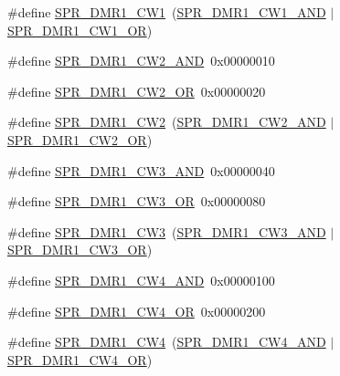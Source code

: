\begin{DoxyCompactItemize}
\item 
\#define \hyperlink{spr-defs_8h_a61edbf72823f6580885faf771a1b9d2e}{\-S\-P\-R\-\_\-\-D\-M\-R1\-\_\-\-C\-W1}~(\hyperlink{spr-defs_8h_a4d0eeeca3feb5fd4553ca7512e0153ad}{\-S\-P\-R\-\_\-\-D\-M\-R1\-\_\-\-C\-W1\-\_\-\-A\-N\-D} $|$ \hyperlink{spr-defs_8h_aa0da9be6e49302d7d11cfeba766cc1e8}{\-S\-P\-R\-\_\-\-D\-M\-R1\-\_\-\-C\-W1\-\_\-\-O\-R})
\item 
\#define \hyperlink{spr-defs_8h_a2a490710981cb9a68025078a3c7e9f95}{\-S\-P\-R\-\_\-\-D\-M\-R1\-\_\-\-C\-W2\-\_\-\-A\-N\-D}~0x00000010
\item 
\#define \hyperlink{spr-defs_8h_a90d7d268719617da9c105c6f3759aad7}{\-S\-P\-R\-\_\-\-D\-M\-R1\-\_\-\-C\-W2\-\_\-\-O\-R}~0x00000020
\item 
\#define \hyperlink{spr-defs_8h_a50fff39b8892ca9f2e098f432c1aee08}{\-S\-P\-R\-\_\-\-D\-M\-R1\-\_\-\-C\-W2}~(\hyperlink{spr-defs_8h_a2a490710981cb9a68025078a3c7e9f95}{\-S\-P\-R\-\_\-\-D\-M\-R1\-\_\-\-C\-W2\-\_\-\-A\-N\-D} $|$ \hyperlink{spr-defs_8h_a90d7d268719617da9c105c6f3759aad7}{\-S\-P\-R\-\_\-\-D\-M\-R1\-\_\-\-C\-W2\-\_\-\-O\-R})
\item 
\#define \hyperlink{spr-defs_8h_aa79fe77c48ff7a17cdf4005b62d5cd97}{\-S\-P\-R\-\_\-\-D\-M\-R1\-\_\-\-C\-W3\-\_\-\-A\-N\-D}~0x00000040
\item 
\#define \hyperlink{spr-defs_8h_a288169d5c179e9676afe0d1dfc8c62ae}{\-S\-P\-R\-\_\-\-D\-M\-R1\-\_\-\-C\-W3\-\_\-\-O\-R}~0x00000080
\item 
\#define \hyperlink{spr-defs_8h_a9435eb28f634aeebb96ba0a6dd05ab70}{\-S\-P\-R\-\_\-\-D\-M\-R1\-\_\-\-C\-W3}~(\hyperlink{spr-defs_8h_aa79fe77c48ff7a17cdf4005b62d5cd97}{\-S\-P\-R\-\_\-\-D\-M\-R1\-\_\-\-C\-W3\-\_\-\-A\-N\-D} $|$ \hyperlink{spr-defs_8h_a288169d5c179e9676afe0d1dfc8c62ae}{\-S\-P\-R\-\_\-\-D\-M\-R1\-\_\-\-C\-W3\-\_\-\-O\-R})
\item 
\#define \hyperlink{spr-defs_8h_a0b3fd8576d97edd997e0be7388f1fb18}{\-S\-P\-R\-\_\-\-D\-M\-R1\-\_\-\-C\-W4\-\_\-\-A\-N\-D}~0x00000100
\item 
\#define \hyperlink{spr-defs_8h_a8dfbf478d52967015228c22a6c6fa178}{\-S\-P\-R\-\_\-\-D\-M\-R1\-\_\-\-C\-W4\-\_\-\-O\-R}~0x00000200
\item 
\#define \hyperlink{spr-defs_8h_a28cac8601079055e7ec39d756564c987}{\-S\-P\-R\-\_\-\-D\-M\-R1\-\_\-\-C\-W4}~(\hyperlink{spr-defs_8h_a0b3fd8576d97edd997e0be7388f1fb18}{\-S\-P\-R\-\_\-\-D\-M\-R1\-\_\-\-C\-W4\-\_\-\-A\-N\-D} $|$ \hyperlink{spr-defs_8h_a8dfbf478d52967015228c22a6c6fa178}{\-S\-P\-R\-\_\-\-D\-M\-R1\-\_\-\-C\-W4\-\_\-\-O\-R})

\end{DoxyCompactItemize}
